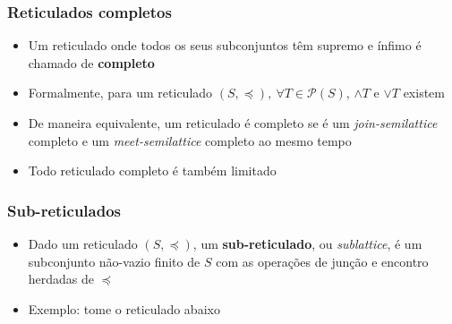 \documentclass[12pt]{beamer}
\begin{document}
\begin{frame}
  \frametitle{Reticulados completos}
  \begin{itemize}
    \item Um reticulado onde todos os seus subconjuntos têm supremo e ínfimo é
        chamado de \textbf{completo}
    \item Formalmente, para um reticulado $(S, \preccurlyeq),\: \forall T \in
        \mathcal{P}(S)$, $\wedge T$ e $\vee T$ existem
    \item De maneira equivalente, um reticulado é completo se é um
        \emph{join-semilattice} completo e um \emph{meet-semilattice} completo
          ao mesmo tempo
    \item Todo reticulado completo é também limitado
  \end{itemize}
\end{frame}

\begin{frame}
  \frametitle{Sub-reticulados}
  \begin{itemize}
    \item Dado um reticulado $(S, \preccurlyeq)$, um \textbf{sub-reticulado},
        ou \emph{sublattice}, é um subconjunto não-vazio finito de $S$ com as
          operações de junção e encontro herdadas de $\preccurlyeq$
    \item Exemplo: tome o reticulado abaixo
    \begin{figure}
    \end{figure}
  \end{itemize}
\end{frame}
\end{document}

